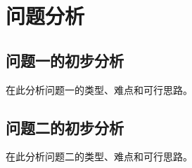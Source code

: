 \section{问题分析}


\subsection{问题一的初步分析}

在此分析问题一的类型、难点和可行思路。

\subsection{问题二的初步分析}

在此分析问题二的类型、难点和可行思路。

